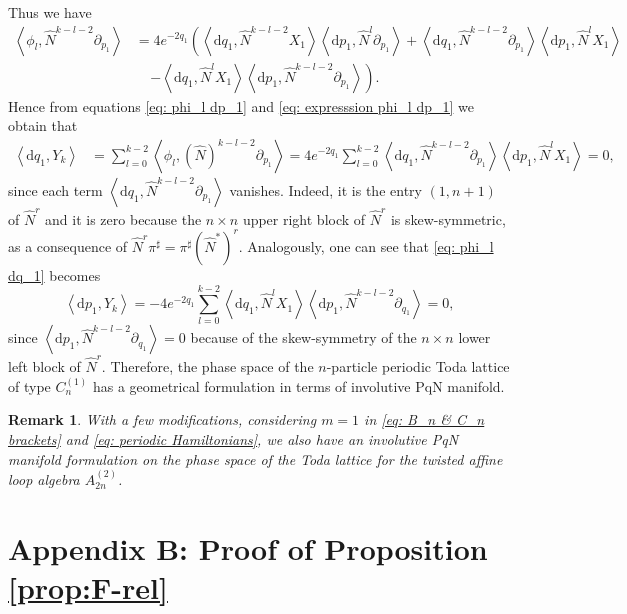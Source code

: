\documentclass[12pt]{article}
\newtheorem{remark}[theorem]{Remark}
\newenvironment{rem}{\begin{remark} \rm}{\end{remark}}
\def\d{{\mathrm d}}
\begin{document}
Thus we have
\begin{equation}
\begin{aligned}
\left<\phi_l,\widehat{N}^{k-l-2}\partial_{p_1}\right>&=4e^{-2q_1}\left(\left<\d q_1,\widehat{N}^{k-l-2}X_1\right>\left<\d p_1,\widehat{N}^{l}\partial_{p_1}\right>+\left<\d q_1,\widehat{N}^{k-l-2}\partial_{p_1}\right>\left<\d p_1,\widehat{N}^{l}X_1\right>\right.\\
&\;\;\;\;\left.-\left<\d q_1,\widehat{N}^lX_1\right>\left<\d p_1,\widehat{N}^{k-l-2}\partial_{p_1}\right>\right).\label{eq: expresssion phi_l dp_1}    
\end{aligned}
\end{equation}
Hence from equations \eqref{eq: phi_l dp_1} and \eqref{eq: expresssion phi_l dp_1} we obtain that
\begin{align*}
\left<\d q_1,Y_k\right>
&=\sum_{l=0}^{k-2}\left<\phi_l,\left(\widehat{N}\right)^{k-l-2}\partial_{p_1}\right>=4e^{-2q_1}\sum_{l=0}^{k-2}\left<\d q_1,\widehat{N}^{k-l-2}\partial_{p_1}\right>\left<\d p_1,\widehat{N}^lX_1\right>=0,
\end{align*}
since each term $\left<\d q_1,\widehat{N}^{k-l-2}\partial_{p_1}\right>$ vanishes. Indeed, it is the entry $(1,n+1)$ 
of $\widehat{N}^r$ and it is zero because the $n\times n$ upper right block of $\widehat{N}^r$ is skew-symmetric, as a consequence of $\widehat{N}^{r}\pi^\sharp=\pi^\sharp(\widehat{N}^*)^{r}$.
Analogously, one can see that \eqref{eq: phi_l dq_1} becomes
\[
\left<\d p_1,Y_k\right>=-4e^{-2q_1}\sum_{l=0}^{k-2}\left<\d q_1,\widehat{N}^{l}X_1\right>\left<\d p_1,\widehat{N}^{k-l-2}\partial_{q_1}\right>=0,
\]
since $\left<\d p_1,\widehat{N}^{k-l-2}\partial_{q_1}\right>=0$ because of the skew-symmetry of the $n\times n$ lower left block  of $\widehat{N}^r$. Therefore, the phase space of the $n$-particle periodic Toda lattice of type $C_{n}^{(1)}$ has a geometrical formulation in terms of involutive PqN manifold.
\begin{rem}
With a few modifications, considering $m=1$ in \eqref{eq: B_n & C_n brackets} 
and \eqref{eq: periodic Hamiltonians}, we also have an involutive PqN manifold formulation 
on the phase space of the %
Toda lattice for the twisted affine loop algebra $A_{2n}^{(2)}$.    
\end{rem}



\section*{Appendix B: Proof of Proposition \ref{prop:F-rel}}
\label{app:4particle-proof}
\end{document}
